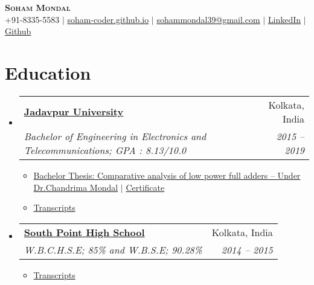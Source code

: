 \documentclass[letterpaper,11pt]{article}
\makeatletter
\newcommand{\resumeItem}[1]{
  \item\small{
    {#1 \vspace{-2pt}}
  }
}
\newcommand{\resumeSubheading}[4]{
  \vspace{-2pt}\item
    \begin{tabular*}{0.97\textwidth}[t]{l@{\extracolsep{\fill}}r}
      \textbf{#1} & #2 \\
      \textit{\small#3} & \textit{\small #4} \\
    \end{tabular*}\vspace{-7pt}
}
\newcommand{\resumeSubHeadingListStart}{\begin{itemize}[leftmargin=0.15in, label={}]}
\newcommand{\resumeSubHeadingListEnd}{\end{itemize}}
\newcommand{\resumeItemListStart}{\begin{itemize}}
\newcommand{\resumeItemListEnd}{\end{itemize}\vspace{-5pt}}
\makeatother
\begin{document}

\begin{center}
    \textbf{\Huge \scshape Soham Mondal} \\ \vspace{1pt}
    \small +91-8335-5583 $|$ \href{https://soham-coder.github.io/site/}{{\color{blue}soham-coder.github.io}} $|$ \href{mailto:x@x.com}{{\color{blue}sohammondal39@gmail.com}} $|$ 
    \href{https://www.linkedin.com/in/soham-mondal-b26071100}{{\color{blue}LinkedIn}} $|$
    \href{https://github.com/Soham-coder}{{\color{blue}Github}}
\end{center}


\section{Education}
  \resumeSubHeadingListStart
    \resumeSubheading
      {\href{http://www.jaduniv.edu.in/}{Jadavpur University}}{Kolkata, India}
      {Bachelor of Engineering in Electronics and Telecommunications; GPA : 8.13/10.0}{2015 -- 2019}
      \resumeItemListStart
      \resumeItem{\small \href{https://drive.google.com/file/d/1CwdRm8W-rhkFXVIGHevxOVgejsCiExxL/view}{{\color{blue}Bachelor Thesis: }{Comparative analysis of low power full adders --  Under \href{http://www.jaduniv.edu.in/profile.php?uid=1028}{Dr.Chandrima Mondal}}} $|$ \href{https://drive.google.com/file/d/1D1JYSpyd7kZolG58Lzm0d6ACEBzQ081y/view}{{\color{blue}Certificate}}}
      \resumeItem{\small \href{https://drive.google.com/drive/u/0/folders/1iIALD35zrpxeOqGVddVz5bWmJTaRaWEh}{{\color{blue}Transcripts}}}
      \resumeItemListEnd
      
    \resumeSubheading
      {\href{https://www.southpoint.edu.in/}{South Point High School}}{Kolkata, India}
      {W.B.C.H.S.E; 85\% and W.B.S.E; 90.28\%}{ 2014 -- 2015}
      \resumeItemListStart
      \resumeItem{\small \href{https://drive.google.com/drive/u/0/folders/0BxM540VPs0PdRGdnU255cHlqUmM}{{\color{blue}Transcripts}}}
      \resumeItemListEnd
  \resumeSubHeadingListEnd
\end{document}
